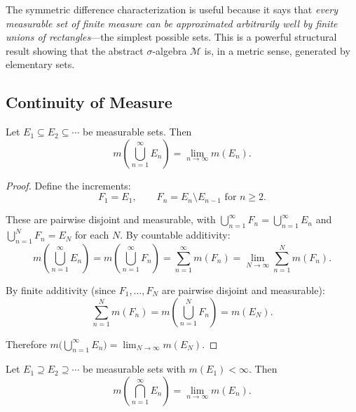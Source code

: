 \documentclass[11pt]{report}
\begin{document}
\begin{rembox}
The symmetric difference characterization is useful because it says that \emph{every measurable set of finite measure can be approximated arbitrarily well by finite unions of rectangles}---the simplest possible sets. This is a powerful structural result showing that the abstract $\sigma$-algebra $\mathcal{M}$ is, in a metric sense, generated by elementary sets.
\end{rembox}

\subsection{Continuity of Measure}

\begin{propbox}
Let $E_1 \subseteq E_2 \subseteq \cdots$ be measurable sets. Then
\[
m\left( \bigcup_{n=1}^{\infty} E_n \right) = \lim_{n \to \infty} m(E_n).
\]
\end{propbox}

\begin{proof}
Define the increments:
\[
F_1 = E_1, \qquad F_n = E_n \setminus E_{n-1} \text{ for } n \geq 2.
\]

These are pairwise disjoint and measurable, with $\bigcup_{n=1}^{\infty} F_n = \bigcup_{n=1}^{\infty} E_n$ and $\bigcup_{n=1}^{N} F_n = E_N$ for each $N$. By countable additivity:
\[
m\left( \bigcup_{n=1}^{\infty} E_n \right) = m\left( \bigcup_{n=1}^{\infty} F_n \right) = \sum_{n=1}^{\infty} m(F_n) = \lim_{N \to \infty} \sum_{n=1}^{N} m(F_n).
\]

By finite additivity (since $F_1, \ldots, F_N$ are pairwise disjoint and measurable):
\[
\sum_{n=1}^{N} m(F_n) = m\left( \bigcup_{n=1}^{N} F_n \right) = m(E_N).
\]

Therefore $m\bigl( \bigcup_{n=1}^{\infty} E_n \bigr) = \lim_{N \to \infty} m(E_N)$.
\end{proof}

\begin{propbox}
Let $E_1 \supseteq E_2 \supseteq \cdots$ be measurable sets with $m(E_1) < \infty$. Then
\[
m\left( \bigcap_{n=1}^{\infty} E_n \right) = \lim_{n \to \infty} m(E_n).
\]
\end{propbox}
\end{document}
